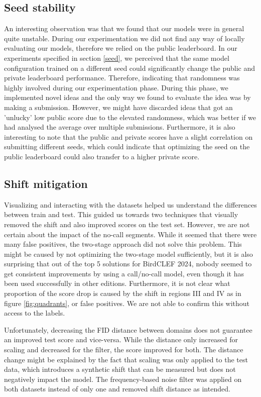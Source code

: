 \documentclass[
]{ceurart}
\begin{document}
\subsection*{Seed stability}
An interesting observation was that we found that our models were in general quite unstable. During our experimentation we did not find any way of locally evaluating our models, therefore we relied on the public leaderboard. In our experiments specified in section \ref{seed}, we perceived that the same model configuration trained on a different seed could significantly change the public and private leaderboard performance. Therefore, indicating that randomness was highly involved during our experimentation phase. During this phase, we implemented novel ideas and the only way we found to evaluate the idea was by making a submission. However, we might have discarded ideas that got an 'unlucky' low public score due to the elevated randomness, which was better if we had analysed the average over multiple submissions. Furthermore, it is also interesting to note that the public and private scores have a slight correlation on submitting different seeds, which could indicate that optimizing the seed on the public leaderboard could also transfer to a higher private score.

\subsection*{Shift mitigation}
Visualizing and interacting with the datasets helped us understand the differences between train and test. This guided us towards two techniques that visually removed the shift and also improved scores on the test set. However, we are not certain about the impact of the no-call segments. While it seemed that there were many false positives, the two-stage approach did not solve this problem. This might be caused by not optimizing the two-stage model sufficiently, but it is also surprising that out of the top 5 solutions for BirdCLEF 2024, nobody seemed to get consistent improvements by using a call/no-call model, even though it has been used successfully in other editions. Furthermore, it is not clear what proportion of the score drop is caused by the shift in regions III and IV as in figure \ref{fig:quadrants}, or false positives. We are not able to confirm this without access to the labels.

Unfortunately, decreasing the FID distance between domains does not guarantee an improved test score and vice-versa. While the distance only increased for scaling and decreased for the filter, the score improved for both. The distance change might be explained by the fact that scaling was only applied to the test data, which introduces a synthetic shift that can be measured but does not negatively impact the model. The frequency-based noise filter was applied on both datasets instead of only one and removed shift distance as intended.
\end{document}
